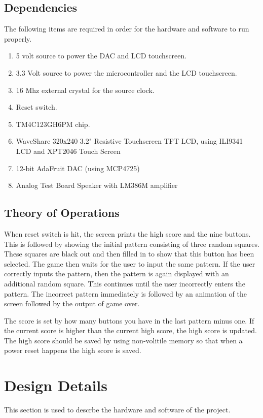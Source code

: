 \documentclass[draft]{article}
\begin{document}
\subsection{Dependencies}
The following items are required in order for the hardware  and software to run properly.
\begin{enumerate}
\item 5 volt source to power the DAC and LCD touchscreen.
\item 3.3 Volt source to power the microcontroller and the LCD touchscreen.
\item 16 Mhz external crystal for the source clock.
\item Reset switch.
\item TM4C123GH6PM chip.
\item WaveShare 320x240 3.2" Resistive Touchscreen TFT LCD, using ILI9341 LCD and XPT2046 Touch Screen
\item 12-bit AdaFruit DAC (using MCP4725)
\item Analog Test Board Speaker with LM386M amplifier
\end{enumerate}

\subsection{Theory of Operations}
When reset switch is hit, the screen prints the high score and the nine buttons.  This is followed by showing the initial pattern consisting of
three random squares.  These squares are black out and then filled in to show that this button has been selected.  The game then waits for
the user to input the same pattern.  If the user correctly inputs the pattern, then the pattern is again displayed with an additional random square.  This continues until the user incorrectly enters the pattern.  The incorrect pattern immediately is followed by an animation of the screen followed by the output of game over.
\par
\noindent
The score is set by how many buttons you have in the last pattern minus one.  If the current score is higher than the current high score, the high score is updated.  The high score should be saved by using non-volitile memory so that when a power reset happens the high score is saved.  

\section{Design Details}
This section is used to descrbe the hardware and software of the project.
\end{document}
